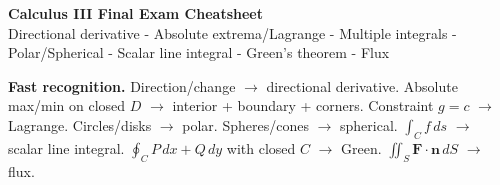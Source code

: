 \documentclass[10pt,a4paper]{article}
\begin{document}
\begin{center}
{\LARGE\bfseries Calculus III Final Exam Cheatsheet}\\[2mm]
{\small Directional derivative - Absolute extrema/Lagrange - Multiple integrals - Polar/Spherical - Scalar line integral - Green's theorem - Flux}
\end{center}

\begin{rulebox}
\textbf{Fast recognition.}
Direction/change $\to$ directional derivative. \quad
Absolute max/min on closed $D$ $\to$ interior + boundary + corners. \quad
Constraint $g=c$ $\to$ Lagrange. \quad
Circles/disks $\to$ polar. \quad
Spheres/cones $\to$ spherical. \quad
$\int_C f\,ds$ $\to$ scalar line integral. \quad
$\oint_C P\,dx+Q\,dy$ with closed $C$ $\to$ Green. \quad
$\iint_S \mathbf F\cdot\mathbf n\,dS$ $\to$ flux.
\end{rulebox}
\end{document}

